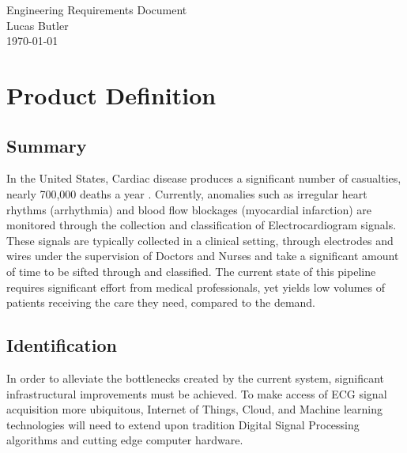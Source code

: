 \documentclass{article}
\begin{document}
\vspace*{\fill}   %

\begin{center}
    {\LARGE Engineering Requirements Document \\}   %
    \vspace{1cm}         %
    {\large Lucas Butler \\}  %
    \vspace{1cm}         %
    {\large \today}      %
\end{center}

\vspace*{\fill}   %

\newpage

\section{Product Definition}

\subsection{Summary}
\quad In the United States, Cardiac disease produces a significant number of casualties, nearly 700,000 deaths a year \cite{cdc}. Currently, anomalies such as irregular heart rhythms (arrhythmia) and blood flow blockages (myocardial infarction) are monitored through the collection and classification of Electrocardiogram signals. These signals are typically collected in a clinical setting, through electrodes and wires under the supervision of Doctors and Nurses and take a significant amount of time to be sifted through and classified. The current state of this pipeline requires significant effort from medical professionals, yet yields low volumes of patients receiving the care they need, compared to the demand. 

\subsection{Identification}
In order to alleviate the bottlenecks created by the current system, significant infrastructural improvements must be achieved. To make access of ECG signal acquisition more ubiquitous, Internet of Things, Cloud, and Machine learning technologies will need to extend upon tradition Digital Signal Processing algorithms and cutting edge computer hardware.
\end{document}

